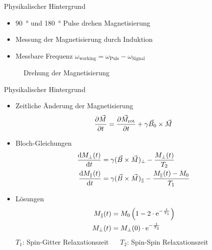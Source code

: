 \begin{frame}{Physikalischer Hintergrund}
	\begin{itemize}
	\item \SI{90}{\degree} und \SI{180}{\degree} Pulse drehen Magnetisierung
	\item Messung der Magnetisierung durch Induktion
	\item Messbare Frequenz $\omega_\text{working}=\omega_\text{Puls}-\omega_\text{Signal}$
	\end{itemize}
	\begin{figure}
	\centering
	
	\caption{Drehung der Magnetisierung}
	\end{figure}
\end{frame}

\begin{frame}{Physikalischer Hintergrund}
	\begin{itemize}
	\item Zeitliche Änderung der Magnetisierung
		\begin{align*}
		\pdv{\vec{M}}{t}=\pdv{\vec{M}_\text{rot}}{t}+\gamma\vec{B}_0\times\vec{M}
		\end{align*}
	\item Bloch-Gleichungen
		\begin{align*}
		\dv{M_\bot(t)}{t}&=\gamma(\vec{B}\times\vec{M})_\bot-\frac{M_\bot(t)}{T_2}\\
		\dv{M_\parallel(t)}{t}&=\gamma(\vec{B}\times\vec{M})_\parallel-\frac{M_\parallel(t)-M_0}{T_1}
		\end{align*}
	\item Lösungen
		\begin{align*}
		M_\parallel (t)&=M_0\left(1-2\cdot\mathrm{e}^{-\frac{t}{T_1}}\right)\\
		M_\bot(t)&=M_\bot(0)\cdot\mathrm{e}^{-\frac{t}{T_2}}
		\end{align*}
	$T_{1}$: Spin-Gitter Relaxationszeit $\quad$ $T_{2}$: Spin-Spin Relaxationszeit
	\end{itemize}
\end{frame}

